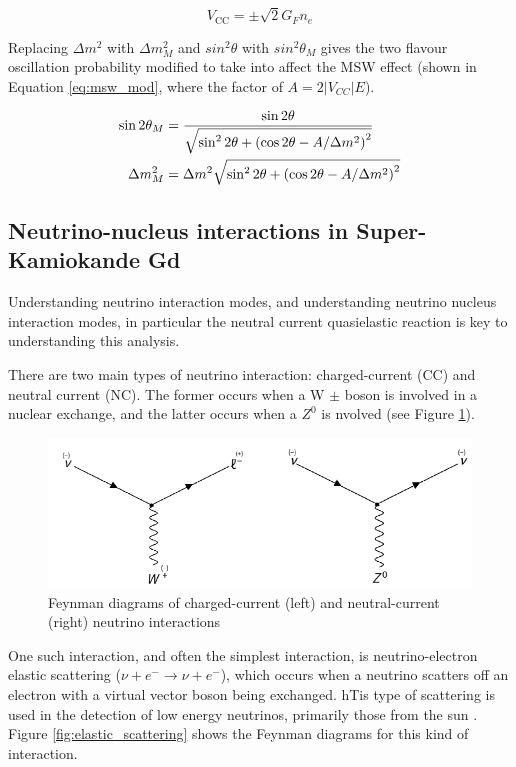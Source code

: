 \begin{equation}
    V_{\mathrm{CC}}=\pm \sqrt{2} G_{F} n_{e}
\label{eq:msw_vcc}
\end{equation}

Replacing $\Delta m^{2}$ with $\Delta m^{2}_{M}$ and $sin^{2}\theta$ with $sin^{2}\theta_{M}$ gives the two flavour oscillation probability modified to take into affect the MSW effect (shown in Equation \ref{eq:msw_mod}, where the factor of $A = 2|V_{CC}|E$).


\begin{align}
\sin 2 \theta_{M} &=\frac{\sin 2 \theta}{\sqrt{\sin ^{2} 2 \theta+\left(\cos 2 \theta-A / \Delta m^{2}\right)^{2}}} \label{eq:msw_mod}\\
\Delta m_{M}^{2} &=\Delta m^{2} \sqrt{\sin ^{2} 2 \theta+\left(\cos 2 \theta-A / \Delta m^{2}\right)^{2}} \notag
\end{align}



\subsection{Neutrino-nucleus interactions in Super-Kamiokande Gd}
Understanding neutrino interaction modes, and understanding neutrino nucleus interaction modes, in particular the neutral current quasielastic reaction is key to understanding this analysis. 

There are two main types of neutrino interaction: charged-current (CC) and neutral current (NC). The former occurs when a W $\pm$ boson is involved in a nuclear exchange, and the latter occurs when a $Z^{0}$ is nvolved (see Figure \ref{fig:CC_NC}).

\begin{figure}
    \includegraphics[width=\textwidth]{Figures/CC_NC.png}
    \caption{Feynman diagrams of charged-current (left) and neutral-current (right) neutrino interactions}
    \label{fig:CC_NC}
\end{figure}


One such interaction, and often the simplest interaction, is neutrino-electron elastic scattering ($\nu+e^{-} \rightarrow \nu+e^{-}$), which occurs when a neutrino scatters off an electron with a virtual vector boson being exchanged. hTis type of scattering is used in the detection of low energy neutrinos, primarily those from the sun \cite{RevModPhys.59.505}. Figure \ref{fig:elastic_scattering} shows the Feynman diagrams for this kind of interaction.

